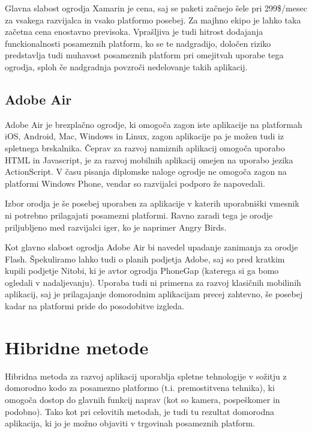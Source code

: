 Glavna slabost ogrodja Xamarin je cena, saj se paketi začnejo šele pri 299\$/mesec za vsakega razvijalca in vsako platformo posebej. Za majhno ekipo je lahko taka začetna cena enostavno previsoka. Vprašljiva je tudi hitrost dodajanja funckionalnosti posameznih platform, ko se te nadgradijo, določen riziko predstavlja tudi muhavost posameznih platform pri omejitvah uporabe tega ogrodja, sploh če nadgradnja povzroči nedelovanje takih aplikacij.

\subsection{Adobe Air}

Adobe Air\cite{adobeair} je brezplačno ogrodje, ki omogoča zagon iste aplikacije na platformah iOS, Android, Mac, Windows in Linux, zagon aplikacije pa je možen tudi iz spletnega brskalnika. Čeprav za razvoj namiznih aplikacij omogoča uporabo HTML in Javascript, je za razvoj mobilnih aplikacij omejen na uporabo jezika ActionScript. V času pisanja diplomske naloge ogrodje ne omogoča zagon na platformi Windows Phone, vendar so razvijalci podporo že napovedali.

Izbor orodja je še posebej uporaben za aplikacije v katerih uporabniški vmesnik ni potrebno prilagajati posamezni platformi. Ravno zaradi tega je orodje priljubljeno med razvijalci iger, ko je naprimer Angry Birds\cite{angrybirds}.

Kot glavno slabost ogrodja Adobe Air bi navedel upadanje zanimanja za orodje Flash. Špekuliramo lahko tudi o planih podjetja Adobe, saj so pred kratkim kupili podjetje Nitobi, ki je avtor ogrodja PhoneGap (katerega si ga bomo ogledali v nadaljevanju). Uporaba tudi ni primerna za razvoj klasičnih mobilinih aplikacij, saj je prilagajanje domorodnim aplikacijam precej zahtevno, še posebej kadar na platformi pride do posodobitve izgleda.

\section{Hibridne metode}

Hibridna metoda za razvoj aplikacij uporablja spletne tehnologije v sožitju z domorodno kodo za posamezno platformo (t.i. premostitvena tehnika), ki omogoča dostop do glavnih funkcij naprav (kot so kamera, pospeškomer in podobno). Tako kot pri celovitih metodah, je tudi tu rezultat domorodna aplikacija, ki jo je možno objaviti v trgovinah posameznih platform.

